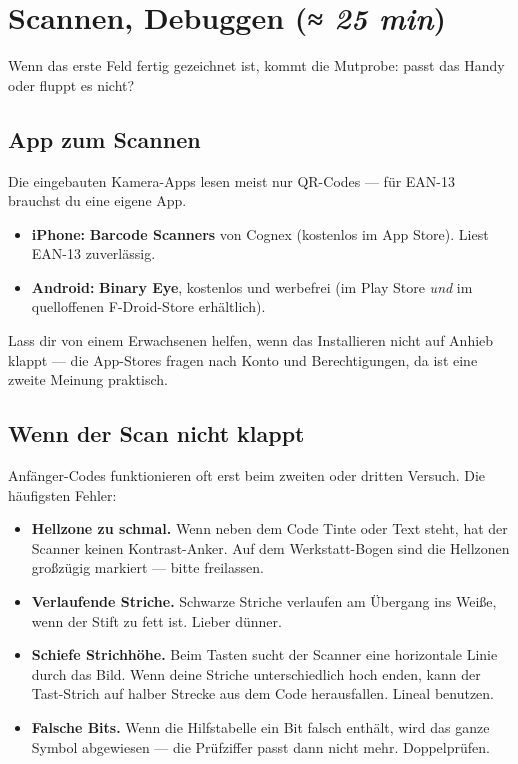 

\section{Scannen, Debuggen \normalfont(\textit{≈ 25 min})}

Wenn das erste Feld fertig gezeichnet ist, kommt die Mutprobe: passt
das Handy oder fluppt es nicht?

\subsection*{App zum Scannen}

Die eingebauten Kamera-Apps lesen meist nur QR-Codes — für EAN-13
brauchst du eine eigene App.

\begin{itemize}
\item \textbf{iPhone:} \textbf{Barcode Scanners} von Cognex
  (kostenlos im App Store). Liest EAN-13 zuverlässig.
\item \textbf{Android:} \textbf{Binary Eye}, kostenlos und werbefrei
  (im Play Store \emph{und} im quelloffenen F-Droid-Store erhältlich).
\end{itemize}

Lass dir von einem Erwachsenen helfen, wenn das Installieren nicht
auf Anhieb klappt — die App-Stores fragen nach Konto und
Berechtigungen, da ist eine zweite Meinung praktisch.

\subsection*{Wenn der Scan nicht klappt}

Anfänger-Codes funktionieren oft erst beim zweiten oder dritten
Versuch. Die häufigsten Fehler:

\begin{itemize}
\item \textbf{Hellzone zu schmal.} Wenn neben dem Code Tinte oder Text
  steht, hat der Scanner keinen Kontrast-Anker. Auf dem Werkstatt-Bogen
  sind die Hellzonen großzügig markiert — bitte freilassen.
\item \textbf{Verlaufende Striche.} Schwarze Striche verlaufen am
  Übergang ins Weiße, wenn der Stift zu fett ist. Lieber dünner.
\item \textbf{Schiefe Strichhöhe.} Beim Tasten sucht der Scanner eine
  horizontale Linie durch das Bild. Wenn deine Striche unterschiedlich
  hoch enden, kann der Tast-Strich auf halber Strecke aus dem Code
  herausfallen. Lineal benutzen.
\item \textbf{Falsche Bits.} Wenn die Hilfstabelle ein Bit falsch
  enthält, wird das ganze Symbol abgewiesen — die Prüfziffer passt
  dann nicht mehr. Doppelprüfen.
\end{itemize}

